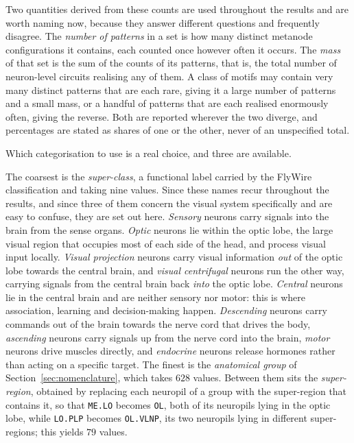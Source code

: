 \documentclass[12pt,a4paper,oneside]{article}
\theoremstyle{definition}
\theoremstyle{plain}
\newcommand{\code}[1]{\texttt{#1}}
\begin{document}
Two quantities derived from these counts are used throughout the results and
are worth naming now, because they answer different questions and frequently
disagree. The \emph{number of patterns} in a set is how many distinct
metanode configurations it contains, each counted once however often it
occurs. The \emph{mass} of that set is the sum of the counts of its patterns,
that is, the total number of neuron-level circuits realising any of them. A
class of motifs may contain very many distinct patterns that are each rare,
giving it a large number of patterns and a small mass, or a handful of
patterns that are each realised enormously often, giving the reverse. Both
are reported wherever the two diverge, and percentages are stated as shares
of one or the other, never of an unspecified total.

Which categorisation to use is a real choice, and three are available.

The coarsest is the \emph{super-class}, a functional label carried by the
FlyWire classification and taking nine values. Since these names recur
throughout the results, and since three of them concern the visual system
specifically and are easy to confuse, they are set out here.
\emph{Sensory} neurons carry signals into the brain from the sense organs.
\emph{Optic} neurons lie within the optic lobe, the large visual region that
occupies most of each side of the head, and process visual input locally.
\emph{Visual projection} neurons carry visual information \emph{out} of the
optic lobe towards the central brain, and \emph{visual centrifugal} neurons
run the other way, carrying signals from the central brain back \emph{into}
the optic lobe. \emph{Central} neurons lie in the central brain and are
neither sensory nor motor: this is where association, learning and
decision-making happen. \emph{Descending} neurons carry commands out of the
brain towards the nerve cord that drives the body, \emph{ascending} neurons
carry signals up from the nerve cord into the brain, \emph{motor} neurons
drive muscles directly, and \emph{endocrine} neurons release hormones rather
than acting on a specific target. The
finest is the \emph{anatomical group} of Section~\ref{sec:nomenclature},
which takes $628$ values. Between them sits the \emph{super-region}, obtained
by replacing each neuropil of a group with the super-region that contains it,
so that \code{ME.LO} becomes \code{OL}, both of its neuropils lying in the
optic lobe, while \code{LO.PLP} becomes \code{OL.VLNP}, its two neuropils
lying in different super-regions; this yields $79$ values.
\end{document}
